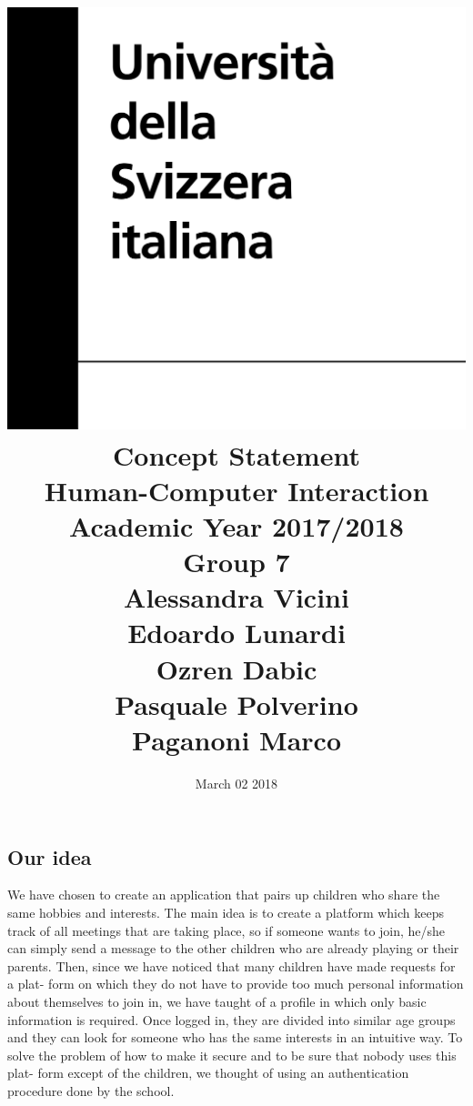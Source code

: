 \documentclass[12pt]{article}
\title {
\includegraphics[width = .2\linewidth]{University-of-Lugano.png} \break \break
{\bf\Huge Concept Statement}
\\\large Human-Computer Interaction
\\\small Academic Year 2017/2018 \break
\\\large \textbf{Group 7}
\\\large Alessandra Vicini \\ Edoardo Lunardi \\ Ozren Dabic \\ Pasquale Polverino \\ Paganoni Marco}
\date{March 02 2018}
\begin{document}
\maketitle
\thispagestyle{empty}
\newpage
\thispagestyle{empty}
\subsection*{Our idea}

\noindent
  We have chosen to create an application that pairs up
  children who share the same hobbies and interests. The main idea is to create
  a platform which keeps track of all meetings
  that are taking place, so if someone wants to join, he/she can simply send a
  message to the other children who are already playing or their parents. Then,
  since we have noticed that many children have
  made requests for a plat- form on which they do not have to provide too much
  personal information about themselves to join in, we have taught of a profile
  in which only basic information is required.
  Once logged in, they are divided into similar age groups and they can look for
  someone who has the same interests in an intuitive way. To solve the problem
  of how to make it secure and to be sure that nobody uses this plat- form except
  of the children, we thought of using an authentication procedure done by the school. \\
\end{document}
